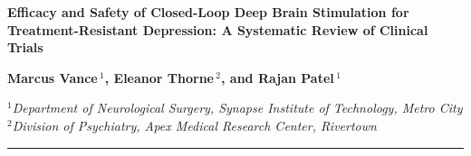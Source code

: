 \begin{center}
  \vspace*{0.5cm}
  
  {\sffamily\LARGE\bfseries\color{primary} Efficacy and Safety of Closed-Loop Deep Brain Stimulation for Treatment-Resistant Depression: A Systematic Review of Clinical Trials}
  
  \vspace{0.8cm}
  
  {\sffamily\large\bfseries Marcus Vance\,$^{1}$, Eleanor Thorne\,$^{2}$, and Rajan Patel\,$^{1}$}
  
  \vspace{0.4cm}
  
  {\small\itshape\color{textmute}
    $^{1}$Department of Neurological Surgery, Synapse Institute of Technology, Metro City \\
    $^{2}$Division of Psychiatry, Apex Medical Research Center, Rivertown
  }
  
  \vspace{0.6cm}
  
  \rule{\linewidth}{1pt}
\end{center}
